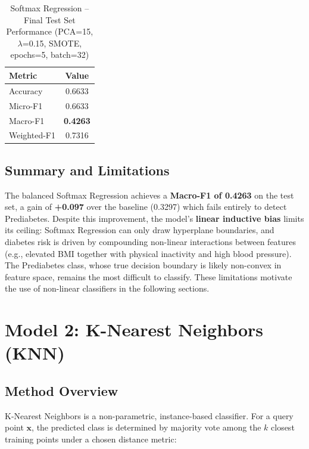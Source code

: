 \documentclass[12pt,a4paper]{article}
\begin{document}
\begin{table}[H]
    \centering
    \caption{Softmax Regression -- Final Test Set Performance (PCA=15, $\lambda$=0.15, SMOTE, epochs=5, batch=32)}
    \label{tab:softmax_final_test}
    \begin{tabular}{lc}
        \toprule
        \textbf{Metric} & \textbf{Value} \\
        \midrule
        Accuracy    & 0.6633 \\
        Micro-F1    & 0.6633 \\
        Macro-F1    & \textbf{0.4263} \\
        Weighted-F1 & 0.7316 \\
        \bottomrule
    \end{tabular}
\end{table}

\subsection{Summary and Limitations}

The balanced Softmax Regression achieves a \textbf{Macro-F1 of 0.4263} on the test set, a gain of \textbf{+0.097} over the baseline (0.3297) which fails entirely to detect Prediabetes. Despite this improvement, the model's \textbf{linear inductive bias} limits its ceiling: Softmax Regression can only draw hyperplane boundaries, and diabetes risk is driven by compounding non-linear interactions between features (e.g., elevated BMI together with physical inactivity and high blood pressure). The Prediabetes class, whose true decision boundary is likely non-convex in feature space, remains the most difficult to classify. These limitations motivate the use of non-linear classifiers in the following sections.

\section{Model 2: K-Nearest Neighbors (KNN)}

\subsection{Method Overview}

K-Nearest Neighbors is a non-parametric, instance-based classifier. For a query point $\mathbf{x}$, the predicted class is determined by majority vote among the $k$ closest training points under a chosen distance metric:
\end{document}
